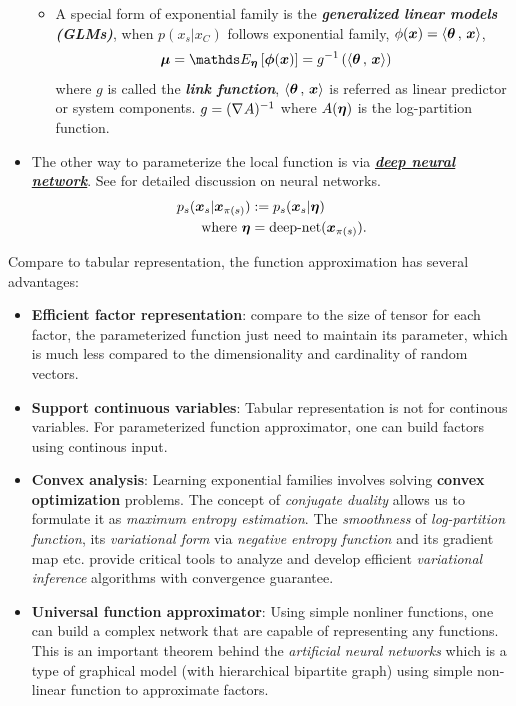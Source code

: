 \documentclass[11pt]{article}
\begin{document}
\begin{itemize}
\begin{itemize}
\item A special form of exponential family is the \emph{\textbf{generalized linear models (GLMs)}}, when $p(x_s | x_{C})$ follows exponential family, $\phi(\boldsymbol{x}) = \left\langle \boldsymbol{\theta}\,,\, \boldsymbol{x} \right\rangle$, 
\begin{align}
\mb{\mu} = \E{\mb{\eta}}{\mb{\phi}(\mb{x})} &= g^{-1}\paren{ \inn{\mb{\theta}}{\mb{x}}} \label{eqn: glm}
\end{align} where $g$ is called the \emph{\textbf{link function}}, $\left\langle \boldsymbol{\theta}\,,\, \boldsymbol{x} \right\rangle$ is referred as linear predictor or system components. $g= (\nabla_{}{A})^{-1}$ where $A(\boldsymbol{\eta})$ is the log-partition function.
\end{itemize}

\item The other way to parameterize the local function is via \underline{\textbf{\emph{deep neural network}}}. See \citep{bengio2009learning, goodfellow2016deep, kingma2019introduction} for detailed discussion on neural networks.
\begin{align}
p_s(\boldsymbol{x}_s | \boldsymbol{x}_{\pi(s)}) &:= p_s(\boldsymbol{x}_s | \boldsymbol{\eta}) \nonumber\\
\text{where } \boldsymbol{\eta}&= \text{deep-net}( \boldsymbol{x}_{\pi(s)}).  \label{eqn: fun_approx_deep_net}
\end{align}
\end{itemize}

Compare to tabular representation, the function approximation has several advantages:
\begin{itemize}
\item \textbf{Efficient factor representation}: compare to the size of tensor for each factor, the parameterized function just need to maintain its parameter, which is much less compared to the dimensionality and cardinality of random vectors. 

\item \textbf{Support continuous variables}: Tabular representation is not for continous variables. For parameterized function approximator, one can build factors using continous input. 

\item \textbf{Convex analysis}: Learning exponential families involves solving \textbf{convex optimization} problems. The concept of \emph{conjugate duality} allows us to formulate it as \emph{maximum entropy estimation}. The \emph{smoothness} of \emph{log-partition function}, its \emph{variational form} via \emph{negative entropy function} and its gradient map etc. provide critical tools to analyze and develop efficient \emph{variational inference} algorithms with convergence guarantee.

\item \textbf{Universal function approximator}: Using simple nonliner functions, one can build a complex network that are capable of representing any functions. This is an important theorem behind the \emph{artificial neural networks} which is a type of graphical model (with hierarchical bipartite graph) using simple non-linear function to approximate factors. 
\end{itemize}
\end{document}
